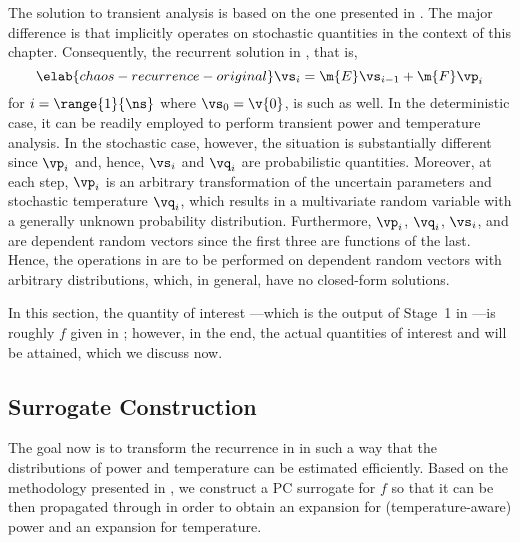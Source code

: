 The solution to transient analysis is based on the one presented in
. The major difference is that
 implicitly operates on stochastic quantities in the
context of this chapter. Consequently, the recurrent solution in
, that is,
\begin{equation} \elab{chaos-recurrence-original}
  \vs_i = \m{E} \vs_{i - 1} + \m{F} \vp_i
\end{equation}
for $i = \range{1}{\ns}$ where $\vs_0 = \v{0}$, is such as well. In the
deterministic case, it can be readily employed to perform transient power and
temperature analysis. In the stochastic case, however, the situation is
substantially different since $\vp_i$ and, hence, $\vs_i$ and $\vq_i$ are
probabilistic quantities. Moreover, at each step, $\vp_i$ is an arbitrary
transformation of the uncertain parameters \vu and stochastic temperature
$\vq_i$, which results in a multivariate random variable with a generally
unknown probability distribution. Furthermore, $\vp_i$, $\vq_i$, $\vs_i$, and
\vu are dependent random vectors since the first three are functions of the
last. Hence, the operations in  are to be
performed on dependent random vectors with arbitrary distributions, which, in
general, have no closed-form solutions.

In this section, the quantity of interest \g---which is the output of Stage~1 in
---is roughly $f$ given in ;
however, in the end, the actual quantities of interest \mp and \mq will be
attained, which we discuss now.

\subsection{Surrogate Construction}

The goal now is to transform the recurrence in 
in such a way that the distributions of power and temperature can be estimated
efficiently. Based on the methodology presented in
, we construct a \ac{PC} surrogate for $f$ so
that it can be then propagated through  in order
to obtain an expansion for (temperature-aware) power and an expansion for
temperature.

